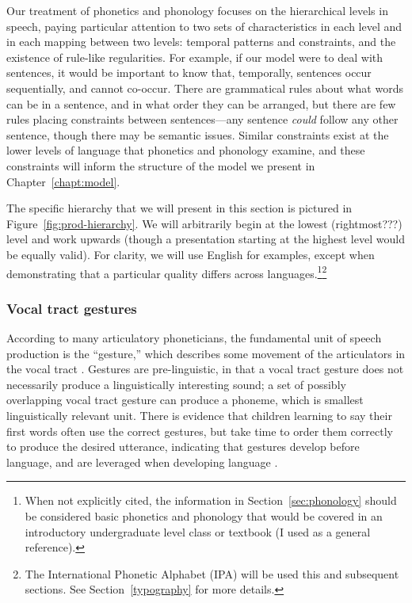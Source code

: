 Our treatment of phonetics and phonology
focuses on the hierarchical levels in speech,
paying particular attention to two
sets of characteristics in each level
and in each mapping between two levels:
temporal patterns and constraints,
and the existence of rule-like regularities.
For example,
if our model were to deal with sentences,
it would be important to know that,
temporally, sentences occur sequentially,
and cannot co-occur.
There are grammatical rules
about what words can be in a sentence,
and in what order they can be arranged,
but there are few rules placing constraints
between sentences---any sentence \textit{could}
follow any other sentence,
though there may be semantic issues.
Similar constraints exist at
the lower levels of language that
phonetics and phonology examine,
and these constraints will
inform the structure of the model
we present in Chapter~\ref{chapt:model}.

The specific hierarchy that we will
present in this section is pictured
in Figure~\ref{fig:prod-hierarchy}.
We will arbitrarily begin at
the lowest (rightmost???) level and work upwards
(though a presentation starting at
the highest level would be equally valid).
For clarity, we will use English for examples,
except when demonstrating that a particular
quality differs across languages.\footnote{
  When not explicitly cited,
  the information in Section~\ref{sec:phonology}
  should be considered
  basic phonetics and phonology
  that would be covered in an
  introductory undergraduate level
  class or textbook
  (I used \citet{roach2010} as a general reference).
}\footnote{The International Phonetic Alphabet (IPA)
  will be used this and subsequent sections.
  See Section~\ref{typography} for more details.}


\subsubsection{Vocal tract gestures}
\label{sec:gestures}

According to many articulatory phoneticians,
the fundamental unit of speech production
is the ``gesture,''
which describes some movement
of the articulators in the vocal tract
\citep{browman1989}.
Gestures are pre-linguistic,
in that a vocal tract gesture
does not necessarily produce
a linguistically interesting sound;
a set of possibly overlapping
vocal tract gesture can produce a phoneme,
which is smallest linguistically relevant unit.
There is evidence that children
learning to say their first words
often use the correct gestures,
but take time to order them correctly
to produce the desired utterance,
indicating that gestures develop
before language,
and are leveraged when
developing language
\citep{browman1989}.

